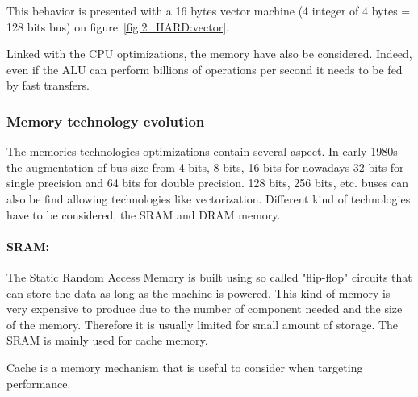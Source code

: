 This behavior is presented with a 16 bytes vector machine (4 integer of 4 bytes = 128 bits bus) on figure~\ref{fig:2_HARD:vector}.

Linked with the CPU optimizations, the memory have also be considered. 
Indeed, even if the ALU can perform billions of operations per second it needs to be fed by fast transfers.

\subsubsection{Memory technology evolution}

The memories technologies optimizations contain several aspect. 
In early 1980s the augmentation of bus size from 4 bits, 8 bits, 16 bits for nowadays 32 bits for single precision and 64 bits for double precision. 
128 bits, 256 bits, etc. buses can also be find allowing technologies like vectorization. 
Different kind of technologies have to be considered, the SRAM and DRAM memory. 

\paragraph{SRAM: }
The Static Random Access Memory is built using so called "flip-flop" circuits that can store the data as long as the machine is powered. 
This kind of memory is very expensive to produce due to the number of component needed and the size of the memory.
Therefore it is usually limited for small amount of storage. 
The SRAM is mainly used for cache memory. 

Cache is a memory mechanism that is useful to consider when targeting performance. 

